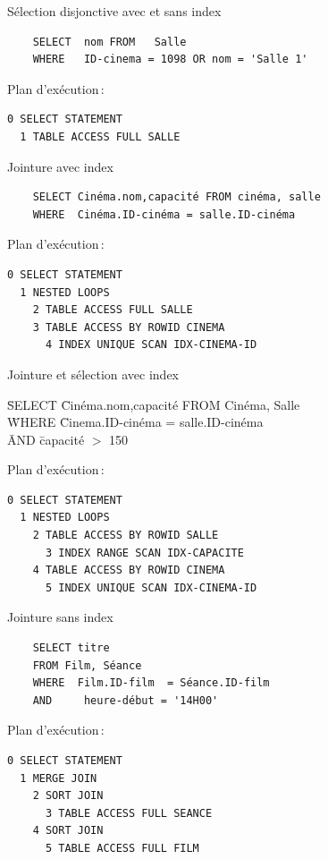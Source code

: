 \begin{frame}{Sélection disjonctive avec et sans index}{


\begin{verbatim}
    SELECT  nom FROM   Salle 
    WHERE   ID-cinema = 1098 OR nom = 'Salle 1'
\end{verbatim}
Plan d'exécution\,:
\begin{verbatim}
0 SELECT STATEMENT
  1 TABLE ACCESS FULL SALLE 
\end{verbatim}
}\end{frame}

\begin{frame}{Jointure avec index}{


\begin{verbatim}
    SELECT Cinéma.nom,capacité FROM cinéma, salle
    WHERE  Cinéma.ID-cinéma = salle.ID-cinéma
\end{verbatim}
Plan d'exécution\,:
\begin{verbatim}
0 SELECT STATEMENT
  1 NESTED LOOPS
    2 TABLE ACCESS FULL SALLE
    3 TABLE ACCESS BY ROWID CINEMA
      4 INDEX UNIQUE SCAN IDX-CINEMA-ID
\end{verbatim}
}\end{frame}

\begin{frame}{Jointure et sélection avec index}{


\begin{tabbing}
   \= SELECT \= Cinéma.nom,capacité FROM Cinéma, Salle\\
   \=  WHERE \=  Cinema.ID-cinéma = salle.ID-cinéma \\
   \=  AND   \= capacité $>$ 150 
\end{tabbing}
Plan d'exécution\,:
\begin{verbatim}
0 SELECT STATEMENT
  1 NESTED LOOPS
    2 TABLE ACCESS BY ROWID SALLE
      3 INDEX RANGE SCAN IDX-CAPACITE
    4 TABLE ACCESS BY ROWID CINEMA
      5 INDEX UNIQUE SCAN IDX-CINEMA-ID
\end{verbatim}
}\end{frame}

\begin{frame}{Jointure sans index}{


\begin{verbatim}
    SELECT titre
    FROM Film, Séance 
    WHERE  Film.ID-film  = Séance.ID-film
    AND     heure-début = '14H00'
\end{verbatim}
Plan d'exécution\,:
\begin{verbatim}
0 SELECT STATEMENT
  1 MERGE JOIN
    2 SORT JOIN
      3 TABLE ACCESS FULL SEANCE
    4 SORT JOIN
      5 TABLE ACCESS FULL FILM
\end{verbatim}
}\end{frame}

